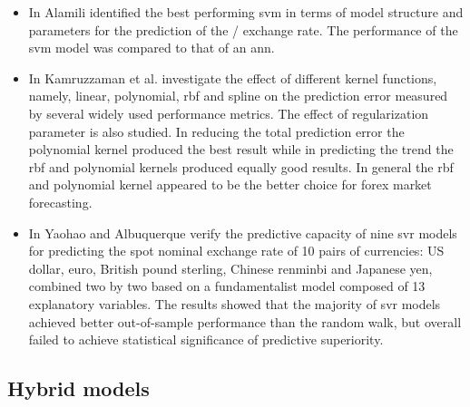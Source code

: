 \begin{itemize}
    \item In \cite{svm-2} Alamili identified the best performing \gls{svm} in terms of model structure and parameters for the prediction of the / exchange rate. The performance of the \gls{svm} model was compared to that of an \gls{ann}.
    \item In \cite{svm-1} Kamruzzaman et al. investigate the effect of different kernel functions, namely, linear, polynomial, \gls{rbf} and spline on the prediction error measured by several widely used performance metrics. The effect of regularization parameter is also studied. In reducing the total prediction error the polynomial kernel produced the best result while in predicting the trend the \gls{rbf} and polynomial kernels produced equally good results. In general the \gls{rbf} and polynomial kernel appeared to be the better choice for \gls{forex} market forecasting.
    \item In \cite{svr} Yaohao and Albuquerque verify the predictive capacity of nine \gls{svr} models for predicting the spot nominal exchange rate of 10 pairs of currencies: US dollar, euro, British pound sterling, Chinese renminbi and Japanese yen, combined two by two based on a fundamentalist model composed of 13 explanatory variables. The results showed that the majority of \gls{svr} models achieved better out-of-sample performance than the random walk, but overall failed to achieve statistical significance of predictive superiority.
\end{itemize}

\subsection{Hybrid models}\label{Hybrid models}

